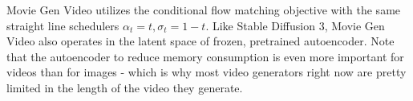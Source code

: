 Movie Gen Video utilizes the conditional flow matching objective with the same straight line schedulers $\alpha_t=t,\sigma_{t}=1-t$. Like Stable Diffusion 3, Movie Gen Video also operates in the latent space of frozen, pretrained autoencoder. Note that the autoencoder to reduce memory consumption is even more important for videos than for images - which is why most video generators right now are pretty limited in the length of the video they generate.
